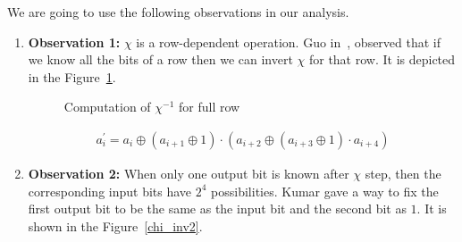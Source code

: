 
We are going to use the following observations in our analysis.
\begin{enumerate}
\item \label{ob1}\textbf{Observation 1:} $\chi$ is a row-dependent operation. Guo \etal in~\cite{guo2016linear}, observed that if we know all the bits of a row then we can invert $\chi$ for that row. It is depicted in the Figure~\ref{chi_inv}.
\begin{figure}
\begin{center}
\end{center}
\caption{Computation of $\chi^{-1}$ for full row \label{chi_inv}}
\end{figure}
\begin{align}
a_i^\prime = a_i \oplus \left( a_{i+1} \oplus 1\right) \cdot \left( a_{i+2} \oplus \left( a_{i+3} \oplus 1 \right) \cdot a_{i+4}\right)
\end{align}


\item \label{ob2}\textbf{Observation 2:} When only one output bit is known after $\chi$ step, then the corresponding input bits have $2^4$ possibilities. Kumar \etal\cite{kumar2018cryptanalysis} gave a way to fix the first output bit to be the same as the input bit and the second bit as $1$. It is shown in the Figure~\ref{chi_inv2}.

\begin{figure}[ht]
\begin{center}
\end{center}
\end{figure}
\end{enumerate}
